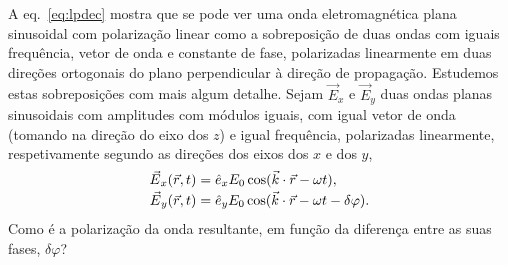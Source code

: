 A eq.~\eqref{eq:lpdec} mostra que se pode ver uma onda eletromagnética plana
sinusoidal com polarização linear como a sobreposição de duas ondas com iguais
frequência, vetor de onda e constante de fase, polarizadas linearmente em
duas direções ortogonais do plano perpendicular à direção de propagação.
Estudemos estas sobreposições com mais algum detalhe. Sejam $\vec E_x$ e $\vec
E_y$ duas ondas planas sinusoidais com amplitudes com módulos iguais, com igual
vetor de onda (tomando na direção do eixo dos $z$) e igual frequência,
polarizadas linearmente, respetivamente segundo as direções dos eixos dos $x$ e
dos $y$,
\begin{align*}
\vec E_x(\vec r,t)&=\he_x E_0\cos(\vec k\cdot\vec r-\omega t),\\
\vec E_y(\vec r,t)&=\he_y E_0\cos(\vec k\cdot\vec r-\omega t - \delta\varphi).
\end{align*}
Como é a polarização da onda resultante, em função da diferença entre as suas
fases, $\delta\varphi$?
